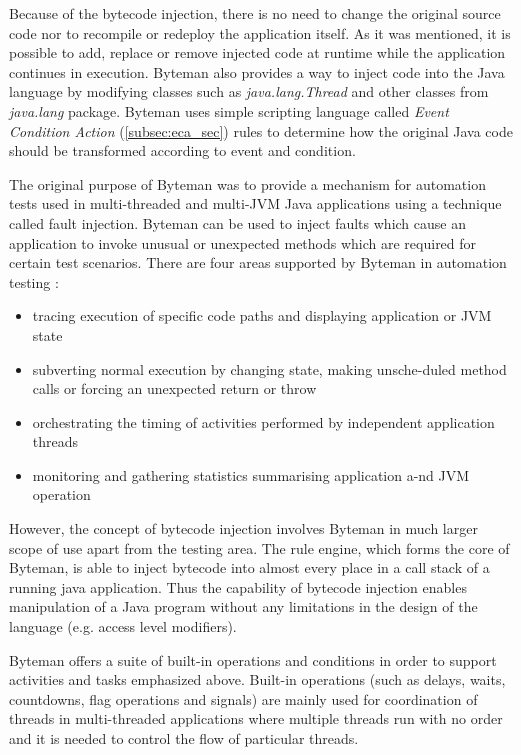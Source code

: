 \documentclass[12pt,oneside]{fithesis2}
\begin{document}
Because of the bytecode injection, there is no need to change the original source code nor to recompile or redeploy the application itself. As it was mentioned, it is possible to add, replace or remove injected code at runtime while the application continues in execution. Byteman also provides a way to inject code into the Java language by modifying classes such as \textit{java.lang.Thread} and other classes from \textit{java.lang} package. Byteman uses simple scripting language called \textit{Event Condition Action} (\ref{subsec:eca_sec}) rules to determine how the original Java code should be transformed according to event and condition.

The original purpose of Byteman was to provide a mechanism for automation tests used in multi-threaded and multi-JVM Java applications using a technique called fault injection. Byteman can be used to inject faults which cause an application to invoke unusual or unexpected methods which are required for certain test scenarios. There are four areas supported by Byteman in automation testing \cite[Introduction to Byteman]{byteman_doc}:

\begin{itemize}
   \item tracing execution of specific code paths and displaying application or JVM state
   \item subverting normal execution by changing state, making unsche-duled method calls or forcing an unexpected return or throw
   \item orchestrating the timing of activities performed by independent application threads
   \item monitoring and gathering statistics summarising application a-nd JVM operation
\end{itemize}
However, the concept of bytecode injection involves Byteman in much larger scope of use apart from the testing area. The rule engine, which forms the core of Byteman, is able to inject bytecode into
almost every place in a call stack of a running java application. Thus the capability of bytecode injection enables manipulation of a Java program without any limitations in the design of the language (e.g. access level modifiers).

Byteman offers a suite of built-in operations and conditions in order to support activities and tasks emphasized above. Built-in operations (such as delays, waits, countdowns, flag operations and signals) are mainly used for coordination of threads in multi-threaded applications where multiple threads run with no order and it is needed to control the flow of particular threads.
\end{document}
